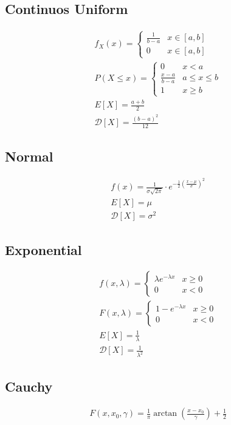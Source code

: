 \subsection{Continuos Uniform}
\begin{gather*}
    f_X(x) =
    \begin{cases}
        \frac{1}{b-a} & x \in [a, b] \\
        0 & x \in [a,b]
    \end{cases} \\
    P(X \leq x) = 
    \begin{cases}
        0 & x < a \\
        \frac{x-a}{b-a} & a \leq x \leq b \\
        1 & x \geq b
    \end{cases} \\
    E[X] = \frac{a + b}{2} \\
    \mathcal{D}[X] = \frac{(b-a)^2}{12}
\end{gather*}

\subsection{Normal}

\begin{gather*}
    f(x) = \frac{1}{\sigma \sqrt{2\pi}} \cdot e^{-\frac{1}{2}\left( \frac{x-\mu}{\sigma} \right)^2} \\
    E[X] = \mu \\
    \mathcal{D}[X] = \sigma^2
\end{gather*}

\subsection{Exponential}
\begin{gather*}
    f(x, \lambda) = 
    \begin{cases}
        \lambda e^{-\lambda x} & x \geq 0 \\
        0 & x < 0
    \end{cases} \\
    F(x, \lambda) = 
    \begin{cases}
        1 - e^{-\lambda x} & x \geq 0 \\
        0 & x < 0
    \end{cases} \\
    E[X] = \frac{1}{\lambda} \\
    \mathcal{D}[X] = \frac{1}{\lambda^2}
\end{gather*}

\subsection{Cauchy}
\begin{gather*}
    F(x, x_0, \gamma) = \frac{1}{\pi} \arctan\left( \frac{x-x_0}{\gamma} \right) + \frac{1}{2}
\end{gather*}
